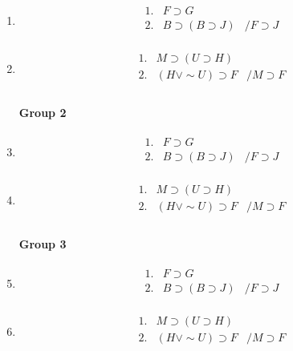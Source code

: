 \documentclass[10pt]{article}
\begin{document}
\begin{enumerate}
  \item \[\begin{array}{lll}
         1. & F \supset G & \\
         2. & B \supset ( B \supset J ) & / F \supset J \\
        \end{array}\]
  \item \[\begin{array}{lll}
         1. & M \supset ( U \supset H ) & \\
         2. & (H \vee \sim U) \supset F & / M \supset F \\
        \end{array}\]


\paragraph{Group 2} 

  \item \[\begin{array}{lll}
         1. & F \supset G & \\
         2. & B \supset ( B \supset J ) & / F \supset J \\
        \end{array}\]
  \item \[\begin{array}{lll}
         1. & M \supset ( U \supset H ) & \\
         2. & (H \vee \sim U) \supset F & / M \supset F \\
        \end{array}\]


\paragraph{Group 3} 

  \item \[\begin{array}{lll}
         1. & F \supset G & \\
         2. & B \supset ( B \supset J ) & / F \supset J \\
        \end{array}\]
  \item \[\begin{array}{lll}
         1. & M \supset ( U \supset H ) & \\
         2. & (H \vee \sim U) \supset F & / M \supset F \\
        \end{array}\]
\end{enumerate}
\end{document}
